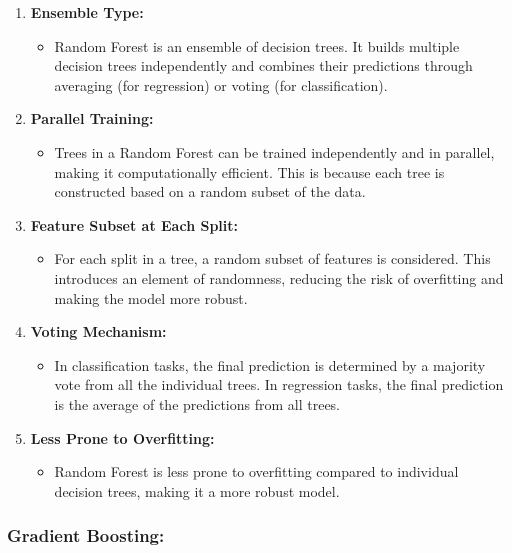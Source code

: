 \documentclass[
]{book}
\providecommand{\tightlist}{%
  \setlength{\itemsep}{0pt}\setlength{\parskip}{0pt}}
\begin{document}
\begin{enumerate}
\def\labelenumi{\arabic{enumi}.}
\tightlist
\item
  \textbf{Ensemble Type:}

  \begin{itemize}
  \tightlist
  \item
    Random Forest is an ensemble of decision trees. It builds multiple decision trees independently and combines their predictions through averaging (for regression) or voting (for classification).
  \end{itemize}
\item
  \textbf{Parallel Training:}

  \begin{itemize}
  \tightlist
  \item
    Trees in a Random Forest can be trained independently and in parallel, making it computationally efficient. This is because each tree is constructed based on a random subset of the data.
  \end{itemize}
\item
  \textbf{Feature Subset at Each Split:}

  \begin{itemize}
  \tightlist
  \item
    For each split in a tree, a random subset of features is considered. This introduces an element of randomness, reducing the risk of overfitting and making the model more robust.
  \end{itemize}
\item
  \textbf{Voting Mechanism:}

  \begin{itemize}
  \tightlist
  \item
    In classification tasks, the final prediction is determined by a majority vote from all the individual trees. In regression tasks, the final prediction is the average of the predictions from all trees.
  \end{itemize}
\item
  \textbf{Less Prone to Overfitting:}

  \begin{itemize}
  \tightlist
  \item
    Random Forest is less prone to overfitting compared to individual decision trees, making it a more robust model.
  \end{itemize}
\end{enumerate}

\hypertarget{gradient-boosting}{%
\subsubsection{Gradient Boosting:}\label{gradient-boosting}}
\end{document}
